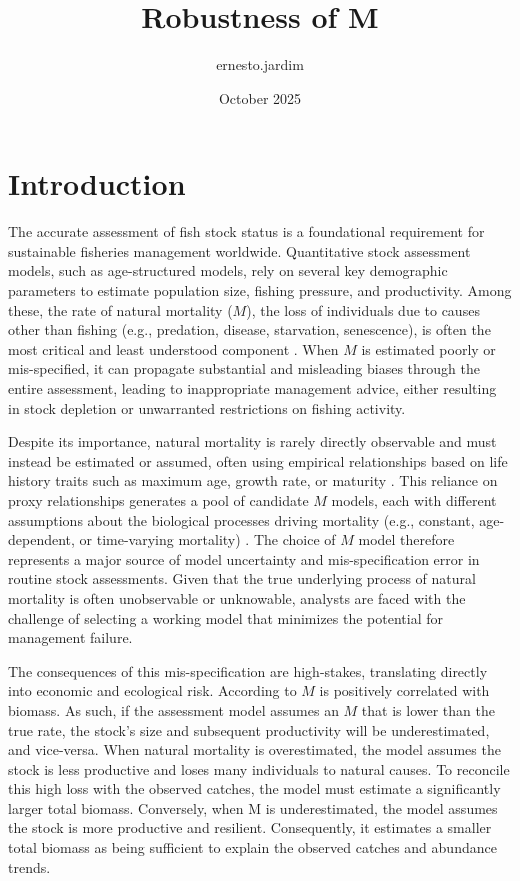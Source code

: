 \documentclass{article}
\title{Robustness of M}
\author{ernesto.jardim }
\date{October 2025}
\begin{document}
\maketitle

\section{Introduction}
\label{sec:introduction}

The accurate assessment of fish stock status is a foundational requirement for sustainable fisheries management worldwide. Quantitative stock assessment models, such as age-structured models, rely on several key demographic parameters to estimate population size, fishing pressure, and productivity. Among these, the rate of natural mortality ($M$), the loss of individuals due to causes other than fishing (e.g., predation, disease, starvation, senescence), is often the most critical and least understood component \cite{QuinnDeriso99, Haddon11}. When $M$ is estimated poorly or mis-specified, it can propagate substantial and misleading biases through the entire assessment, leading to inappropriate management advice, either resulting in stock depletion or unwarranted restrictions on fishing activity.

Despite its importance, natural mortality is rarely directly observable and must instead be estimated or assumed, often using empirical relationships based on life history traits such as maximum age, growth rate, or maturity \cite{Jensen96, Gislason10, then2014, kenchington2014}. This reliance on proxy relationships generates a pool of candidate $M$ models, each with different assumptions about the biological processes driving mortality (e.g., constant, age-dependent, or time-varying mortality) \cite{Liu22}. The choice of $M$ model therefore represents a major source of model uncertainty and mis-specification error in routine stock assessments. Given that the true underlying process of natural mortality is often unobservable or unknowable, analysts are faced with the challenge of selecting a working model that minimizes the potential for management failure.

The consequences of this mis-specification are high-stakes, translating directly into economic and ecological risk. According to \citep{Punt21} $M$ is positively correlated with biomass. As such, if the assessment model assumes an $M$ that is lower than the true rate, the stock's size and subsequent productivity will be underestimated, and vice-versa. When natural mortality is overestimated, the model assumes the stock is less productive and loses many individuals to natural causes. To reconcile this high loss with the observed catches, the model must estimate a significantly larger total biomass. Conversely, when M is underestimated, the model assumes the stock is more productive and resilient. Consequently, it estimates a smaller total biomass as being sufficient to explain the observed catches and abundance trends.
\end{document}
